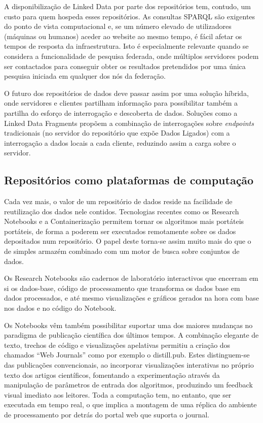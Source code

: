 \documentclass[sigconf,nonacm]{acmart}
\begin{document}
A disponibilização de Linked Data por parte dos repositórios tem, contudo, um custo para quem hospeda esses repositórios. As consultas SPARQL são exigentes do ponto de vista computacional e, se um número elevado de utilizadores (máquinas ou humanos) aceder ao website ao mesmo tempo, é fácil afetar os tempos de resposta da infraestrutura. Isto é especialmente relevante quando se considera a funcionalidade de pesquisa federada, onde múltiplos servidores podem ser contactados para conseguir obter os resultados pretendidos por uma única pesquisa iniciada em qualquer dos nós da federação.

O futuro dos repositórios de dados deve passar assim por uma solução híbrida, onde servidores e clientes partilham informação para possibilitar também a partilha do esforço de interrogação e descoberta de dados. Soluções como a Linked Data Fragments\cite{VERBORGH2016184} propõem a combinação de interrogações sobre \textit{endpoints} tradicionais (no servidor do repositório que expõe Dados Ligados) com a interrogação a dados locais a cada cliente, reduzindo assim a carga sobre o servidor.


\subsection{Repositórios como plataformas de computação} %
\label{sub:repositorios_como_plataformas_de_computacao}

Cada vez mais, o valor de um repositório de dados reside na facilidade de reutilização dos dados nele contidos. Tecnologias recentes como os Research Notebooks e a Containerização permitem tornar os algoritmos mais portáteis portáteis, de forma a poderem ser executados remotamente sobre os dados depositados num repositório. O papel deste torna-se assim muito mais do que o de simples armazém combinado com um motor de busca sobre conjuntos de dados.

Os Research Notebooks são cadernos de laboratório interactivos que encerram em si os dados-base, código de processamento que transforma os dados base em dados processados, e até mesmo visualizações e gráficos gerados na hora com base nos dados e no código do Notebook.

Os Notebooks vêm também possibilitar suportar uma dos maiores mudanças no paradigma de publicação científica dos últimos tempos. A combinação elegante de texto, trechos de código e visualizações apelativas permitiu a criação dos chamados ``Web Journals'' como por exemplo o distill.pub. Estes distinguem-se das publicações convencionais, ao incorporar visualizações interativas no próprio texto dos artigos científicos, fomentando a experimentação através da manipulação de parâmetros de entrada dos algoritmos, produzindo um feedback visual imediato aos leitores. Toda a computação tem, no entanto, que ser executada em tempo real, o que implica a montagem de uma réplica do ambiente de processamento por detrás do portal web que suporta o journal.
\end{document}
